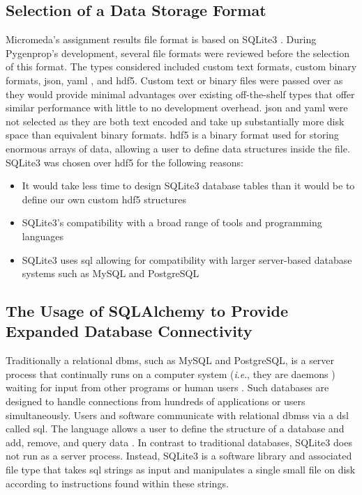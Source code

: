 \subsection{Selection of a Data Storage Format}

Micromeda's assignment results file format is based on SQLite3 
\cite{owens2006definitive}. During Pygenprop's development, several file formats 
were reviewed before the selection of this format. The types considered included 
custom text formats, custom binary formats, \gls{json}, \gls{yaml} 
\cite{ben2005yaml}, and \gls{hdf5}. Custom text or binary files were passed over 
as they would provide minimal advantages over existing off-the-shelf types that 
offer similar performance with little to no development overhead. \gls{json} and 
\gls{yaml} were not selected as they are both text encoded and take up 
substantially more disk space than equivalent binary formats. \gls{hdf5} 
\cite{folk2011overview} is a binary format used for storing enormous arrays of 
data, allowing a user to define data structures inside the file. SQLite3 was 
chosen over \gls{hdf5} for the following reasons:

\FloatBarrier
\begin{itemize}
\item It would take less time to design SQLite3 database tables than it would be 
to define our own custom \gls{hdf5} structures
\item SQLite3's compatibility with a broad range of tools and programming 
languages
\item SQLite3 uses \gls{sql} \cite{sql1987guide} allowing for compatibility with 
larger server-based database systems such as MySQL \cite{dubois1999mysql} and 
PostgreSQL \cite{momjian2001postgresql, owens2006definitive}
\end{itemize}

\subsection{The Usage of SQLAlchemy to Provide Expanded Database Connectivity} 
\label{SQLAlchemy}

Traditionally a relational \gls{dbms}, such as MySQL and PostgreSQL, is a server 
process that continually runs on a computer system (\textit{i}.\textit{e}., they 
are daemons \cite{martin2006computer}) waiting for input from other programs or 
human users \cite{dubois1999mysql, momjian2001postgresql}. Such databases are 
designed to handle connections from hundreds of applications or users 
simultaneously. Users and software communicate with relational \gls{dbms}s via a 
\gls{dsl} called \gls{sql}. The language allows a user to define the structure 
of a database and add, remove, and query data \cite{sql1987guide}. In contrast 
to traditional databases, SQLite3 does not run as a server process. Instead, 
SQLite3 is a software library and associated file type that takes \gls{sql} 
strings as input and manipulates a single small file on disk 
\cite{owens2006definitive} according to instructions found within these strings.

